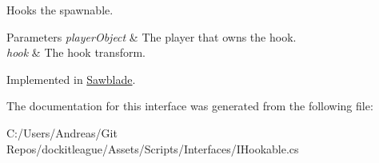 Hooks the spawnable. 


\begin{DoxyParams}{Parameters}
{\em player\+Object} & The player that owns the hook.\\
\hline
{\em hook} & The hook transform.\\
\hline
\end{DoxyParams}


Implemented in \hyperlink{class_sawblade_a38819b3411e1492b0eeb19ffcaf1dfb1}{Sawblade}.



The documentation for this interface was generated from the following file\+:\begin{DoxyCompactItemize}
\item 
C\+:/\+Users/\+Andreas/\+Git Repos/dockitleague/\+Assets/\+Scripts/\+Interfaces/I\+Hookable.\+cs\end{DoxyCompactItemize}
